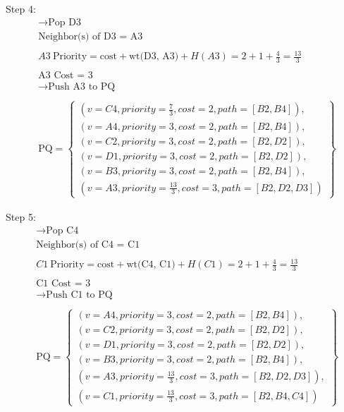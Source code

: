 \documentclass[a4paper]{article}
\begin{document}
\begin{sloppypar}
\begin{enumerate}[start=6,label=Q\arabic*,left=0pt]
    \par Step 4:
    \begin{align*}
        &\rightarrow \text{Pop D3} \\
        &\text{Neighbor(s) of D3 = A3} \\\\
        &A3 \: \text{Priority} = \text{cost} + \text{wt(D3, A3)} + H(A3) = 2 + 1 + \frac{4}{3} = \frac{13}{3} \\\\
        &\text{A3 Cost = 3} \\
        &\rightarrow \text{Push A3 to PQ} \\\\
        &\text{PQ} = \left\{\begin{array}{l}
            (v=C4, priority=\frac{7}{3}, cost=2, path=[B2, B4]), \\
            (v=A4, priority=3, cost=2, path=[B2, B4]), \\
            (v=C2, priority=3, cost=2, path=[B2, D2]), \\
            (v=D1, priority=3, cost=2, path=[B2, D2]), \\
            (v=B3, priority=3, cost=2, path=[B2, B4]), \\
            (v=A3, priority=\frac{13}{3}, cost=3, path=[B2, D2, D3])
        \end{array}\right\}
    \end{align*}

    \par Step 5:
    \begin{align*}
        &\rightarrow \text{Pop C4} \\
        &\text{Neighbor(s) of C4 = C1} \\\\
        &C1 \: \text{Priority} = \text{cost} + \text{wt(C4, C1)} + H(C1) = 2 + 1 + \frac{4}{3} = \frac{13}{3} \\\\
        &\text{C1 Cost = 3} \\
        &\rightarrow \text{Push C1 to PQ} \\\\
        &\text{PQ} = \left\{\begin{array}{l}
            (v=A4, priority=3, cost=2, path=[B2, B4]), \\
            (v=C2, priority=3, cost=2, path=[B2, D2]), \\
            (v=D1, priority=3, cost=2, path=[B2, D2]), \\
            (v=B3, priority=3, cost=2, path=[B2, B4]), \\
            (v=A3, priority=\frac{13}{3}, cost=3, path=[B2, D2, D3]), \\
            (v=C1, priority=\frac{13}{3}, cost=3, path=[B2, B4, C4])
        \end{array}\right\}
    \end{align*}


\end{enumerate}
\end{sloppypar}
\end{document}
